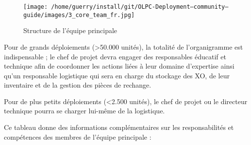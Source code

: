 \documentclass[11pt]{article}
\begin{document}
\begin{figure}[htb]
\centering
\texttt{[image: /home/guerry/install/git/OLPC-Deployment--community--guide/images/3\_core\_team\_fr.jpg]}
\caption{Structure de l'équipe principale}
\end{figure}

Pour de grands déploiements (>50.000 unités), la totalité de l'organigramme
est indispensable ; le chef de projet devra engager des responsables
éducatif et technique afin de coordonner les actions liées à leur domaine
d'expertise ainsi qu'un responsable logistique qui sera en charge du
stockage des XO, de leur inventaire et de la gestion des pièces de
rechange.

Pour de plus petits déploiements (<2.500 unités), le chef de projet ou le
directeur technique pourra se charger lui-même de la logistique.

Ce tableau donne des informations complémentaires sur les responsabilités
et compétences des membres de l'équipe principale :

\end{document}
